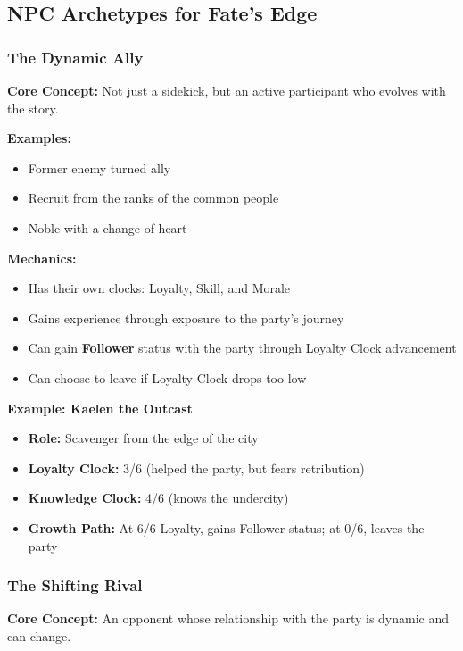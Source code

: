 \subsection{NPC Archetypes for Fate's Edge}

\subsubsection{The Dynamic Ally}

\textbf{Core Concept:} Not just a sidekick, but an active participant who evolves with the story.

\textbf{Examples:}
\begin{itemize}
  \item Former enemy turned ally
  \item Recruit from the ranks of the common people
  \item Noble with a change of heart
\end{itemize}

\textbf{Mechanics:}
\begin{itemize}
  \item Has their own clocks: Loyalty, Skill, and Morale
  \item Gains experience through exposure to the party's journey
  \item Can gain \textbf{Follower} status with the party through Loyalty Clock advancement
  \item Can choose to leave if Loyalty Clock drops too low
\end{itemize}

\textbf{Example: Kaelen the Outcast}
\begin{itemize}
  \item \textbf{Role:} Scavenger from the edge of the city
  \item \textbf{Loyalty Clock:} 3/6 (helped the party, but fears retribution)
  \item \textbf{Knowledge Clock:} 4/6 (knows the undercity)
  \item \textbf{Growth Path:} At 6/6 Loyalty, gains Follower status; at 0/6, leaves the party
\end{itemize}

\subsubsection{The Shifting Rival}

\textbf{Core Concept:} An opponent whose relationship with the party is dynamic and can change.

